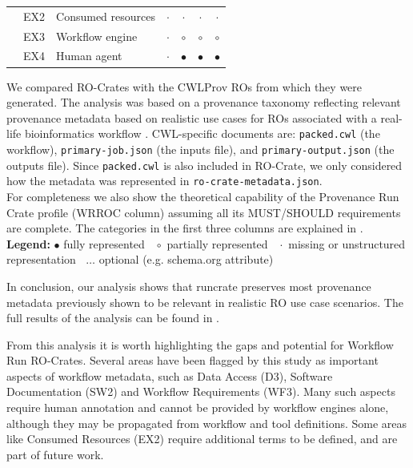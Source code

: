 \begin{table}[tp]
\begin{tabular}{r|l|l|c|c|c|c}
& EX2 & Consumed resources      & $\cdot$ & $\cdot$ & $\cdot$ & $\cdot$  \\ 
& EX3 & Workflow engine         & $\cdot$ & $\circ$ & $\circ$ & $\circ$  \\  
& EX4 & Human agent             & $\cdot$ & $\bullet$ & $\bullet$ & $\bullet$ \\ \hline
\end{tabular}
\begin{flushleft}
  \small We compared RO-Crates with the CWLProv ROs from which they were generated.
The analysis was based on a provenance taxonomy reflecting relevant provenance metadata based on realistic use cases for ROs associated with a real-life bioinformatics workflow \cite{de Wit 2022}.
CWL-specific documents are: \texttt{packed.cwl} (the workflow), \texttt{primary-job.json} (the inputs file), and \texttt{primary-output.json} (the outputs file).
Since \texttt{packed.cwl} is also included in RO-Crate, we only considered how the metadata was represented in \texttt{ro-crate-metadata.json}.\\
For completeness we also show the theoretical capability of the Provenance Run Crate profile (WRROC column) assuming all its MUST/SHOULD requirements are complete.
The categories in the first three columns are explained in \cite{de Wit 2022}.
\\
\textbf{Legend:} $\bullet$ fully represented  $\;\;\circ$ partially represented   $\;\;\cdot$ missing or unstructured representation $\;\;\dots$ optional (e.g. schema.org attribute)
\end{flushleft}
\label{ch54:analysis_table}
\end{table}

In conclusion, our analysis shows that runcrate preserves most provenance metadata previously shown to be relevant in realistic RO use case scenarios.
The full results of the analysis can be found in \cite{de Wit 2023}.

From this analysis it is worth highlighting the gaps and potential for Workflow Run RO-Crates. Several areas have been flagged by this study as important aspects of workflow metadata, such as Data Access (D3), Software Documentation (SW2) and Workflow Requirements (WF3). Many such aspects require human annotation and cannot be provided by workflow engines alone, although they may be propagated from workflow and tool definitions. Some areas like Consumed Resources (EX2) require additional terms to be defined, and are part of future work.


